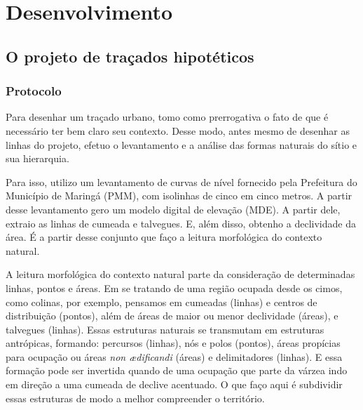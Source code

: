 \documentclass[12pt, a4paper]{book} %
\begin{document}
        
    \part[Desenvolvimento]{Desenvolvimento}

        \chapter[Traçados hipotéticos]{O projeto de traçados hipotéticos}

            \section{Protocolo}

        Para desenhar um traçado urbano, tomo como prerrogativa o fato de que é necessário ter bem claro seu contexto. Desse modo, antes mesmo de desenhar as linhas do projeto, efetuo o levantamento e a análise das formas naturais do sítio e sua hierarquia. 

        Para isso, utilizo um levantamento de curvas de nível fornecido pela Prefeitura do Município de Maringá (PMM), com isolinhas de cinco em cinco metros. A partir desse levantamento gero um modelo digital de elevação (MDE). A partir dele, extraio as linhas de cumeada e talvegues. E, além disso, obtenho a declividade da área. É a partir desse conjunto que faço a leitura morfológica do contexto natural.

        A leitura morfológica do contexto natural parte da consideração de determinadas linhas, pontos e áreas. Em se tratando de uma região ocupada desde os cimos, como colinas, por exemplo, pensamos em cumeadas (linhas) e centros de distribuição (pontos), além de áreas de maior ou menor declividade (áreas), e talvegues (linhas). Essas estruturas naturais se transmutam em estruturas antrópicas, formando: percursos (linhas), nós e polos (pontos), áreas propícias para ocupação ou áreas \textit{non ædificandi} (áreas) e delimitadores (linhas). E essa formação pode ser invertida quando de uma ocupação que parte da várzea indo em direção a uma cumeada de declive acentuado. O que faço aqui é subdividir essas estruturas de modo a melhor compreender o território. 
        
\end{document}
